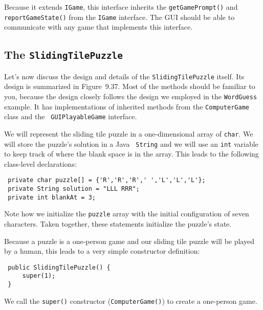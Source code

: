 \noindent Because it extends {\tt IGame}, this interface inherits the
{\tt getGamePrompt()} and {\tt report\-Game\-State()} from the {\tt IGame}
interface. The GUI should be able to communicate with any game that
implements this interface.

\subsection{The {\tt SlidingTilePuzzle}}

Let's now discuss the design and details of the 
{\tt SlidingTilePuzzle} itself. Its design is summarized in
Figure~9.37.  Most of the methods should be familiar
to you, because the design closely follows the design we employed in
the {\tt WordGuess} example. It has implementations of inherited
methods from the {\tt ComputerGame} class and the {\tt
GUIPlayableGame} interface.  

We will represent the sliding tile puzzle in a one-dimensional array
of {\tt char}. We will store the puzzle's solution in a Java {\tt
String} and we will use an {\tt int} variable to keep track of where
the blank space is in the array.  This leads to the following
class-level declarations:

\begin{jjjlisting}
\begin{lstlisting}
 private char puzzle[] = {'R','R','R',' ','L','L','L'};
 private String solution = "LLL RRR";
 private int blankAt = 3;
\end{lstlisting}
\end{jjjlisting}

\noindent Note how we initialize the {\tt puzzle} array with the
initial configuration of seven characters. Taken together, these
statements initialize the puzzle's state.

Because a puzzle is a one-person game and our sliding tile puzzle will be
played by a human, this leads to a very simple constructor 
definition:

\begin{jjjlisting}
\begin{lstlisting}
 public SlidingTilePuzzle() {
     super(1);
 }
\end{lstlisting}
\end{jjjlisting}

\noindent We call the {\tt super()} constructor ({\tt ComputerGame()})
to create a one-person game.

